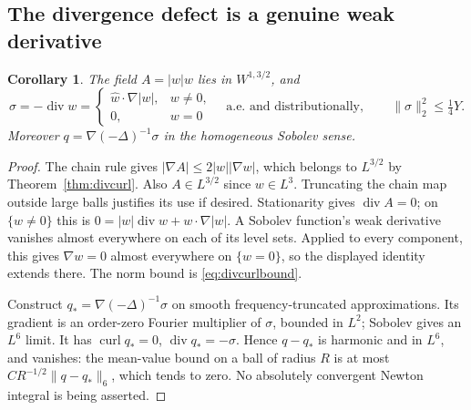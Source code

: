 \documentclass[11pt,a4paper]{article}
\newtheorem{corollary}[theorem]{Corollary}
\theoremstyle{definition}
\theoremstyle{remark}
\newcommand{\norm}[1]{\lVert #1\rVert}
\newcommand{\diver}{\operatorname{div}}
\newcommand{\curl}{\operatorname{curl}}
\numberwithin{equation}{section}
\begin{document}
\subsection{The divergence defect is a genuine weak derivative}
\begin{corollary}\label{cor:sigma}
The field \(A=|w|w\) lies in \(W^{1,3/2}\), and
\begin{equation}\label{eq:sigma}
\sigma=-\diver w
=\begin{cases}\widehat w\cdot\nabla|w|,&w\ne0,\\0,&w=0\end{cases}
\quad\text{a.e. and distributionally},
\qquad \norm\sigma_2^2\le\tfrac14Y.
\end{equation}
Moreover \(q=\nabla(-\Delta)^{-1}\sigma\) in the homogeneous Sobolev sense.
\end{corollary}
\begin{proof}
The chain rule gives \(|\nabla A|\le2|w||\nabla w|\), which belongs to \(L^{3/2}\) by Theorem~\ref{thm:divcurl}. Also \(A\in L^{3/2}\) since \(w\in L^3\). Truncating the chain map outside large balls justifies its use if desired. Stationarity gives \(\diver A=0\); on \(\{w\ne0\}\) this is
\(0=|w|\diver w+w\cdot\nabla|w|\).
A Sobolev function's weak derivative vanishes almost everywhere on each of its level sets. Applied to every component, this gives \(\nabla w=0\) almost everywhere on \(\{w=0\}\), so the displayed identity extends there. The norm bound is \eqref{eq:divcurlbound}.

Construct \(q_* =\nabla(-\Delta)^{-1}\sigma\) on smooth frequency-truncated approximations. Its gradient is an order-zero Fourier multiplier of \(\sigma\), bounded in \(L^2\); Sobolev gives an \(L^6\) limit. It has \(\curl q_*=0\), \(\diver q_*=-\sigma\). Hence \(q-q_*\) is harmonic and in \(L^6\), and vanishes: the mean-value bound on a ball of radius \(R\) is at most \(CR^{-1/2}\norm{q-q_*}_6\), which tends to zero. No absolutely convergent Newton integral is being asserted.
\end{proof}
\end{document}
